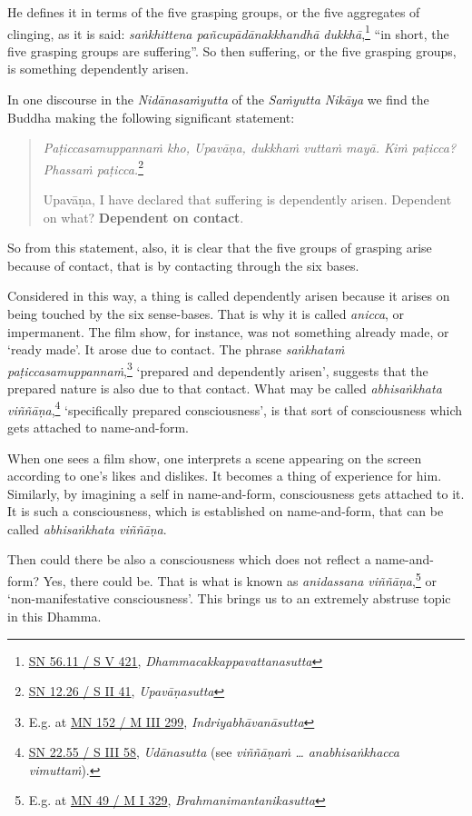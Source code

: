 He defines it in terms of the five grasping groups, or the five aggregates of clinging, as it is said: \emph{saṅkhittena pañcupādānakkhandhā dukkhā},\footnote{\href{https://suttacentral.net/sn56.11/pli/ms}{SN 56.11 / S V 421}, \emph{Dhammacakkappavattanasutta}} ``in short, the five grasping groups are suffering''. So then suffering, or the five grasping groups, is something dependently arisen.

In one discourse in the \emph{Nidānasaṁyutta} of the \emph{Saṁyutta Nikāya} we find the Buddha making the following significant statement:

\begin{quote}
\emph{Paṭiccasamuppannaṁ kho, Upavāṇa, dukkhaṁ vuttaṁ mayā. Kiṁ paṭicca? Phassaṁ paṭicca.}\footnote{\href{https://suttacentral.net/sn12.26/pli/ms}{SN 12.26 / S II 41}, \emph{Upavāṇasutta}}

Upavāṇa, I have declared that suffering is dependently arisen. Dependent on what? \textbf{Dependent on contact}.
\end{quote}

So from this statement, also, it is clear that the five groups of grasping arise because of contact, that is by contacting through the six bases.

Considered in this way, a thing is called dependently arisen because it arises on being touched by the six sense-bases. That is why it is called \emph{anicca}, or impermanent. The film show, for instance, was not something already made, or `ready made'. It arose due to contact. The phrase \emph{saṅkhataṁ paṭiccasamuppannaṁ},\footnote{E.g. at \href{https://suttacentral.net/mn152/pli/ms}{MN 152 / M III 299}, \emph{Indriyabhāvanāsutta}} `prepared and dependently arisen', suggests that the prepared nature is also due to that contact. What may be called \emph{abhisaṅkhata viññāṇa},\footnote{\href{https://suttacentral.net/sn22.55/pli/ms}{SN 22.55 / S III 58}, \emph{Udānasutta} (see \emph{viññāṇaṁ \ldots{} anabhisaṅkhacca vimuttaṁ}).} `specifically prepared consciousness', is that sort of consciousness which gets attached to name-and-form.

When one sees a film show, one interprets a scene appearing on the screen according to one's likes and dislikes. It becomes a thing of experience for him. Similarly, by imagining a self in name-and-form, consciousness gets attached to it. It is such a consciousness, which is established on name-and-form, that can be called \emph{abhisaṅkhata viññāṇa}.

Then could there be also a consciousness which does not reflect a name-and-form? Yes, there could be. That is what is known as \emph{anidassana viññāṇa},\footnote{E.g. at \href{https://suttacentral.net/mn49/pli/ms}{MN 49 / M I 329}, \emph{Brahmanimantanikasutta}} or `non-manifestative consciousness'. This brings us to an extremely abstruse topic in this Dhamma.

